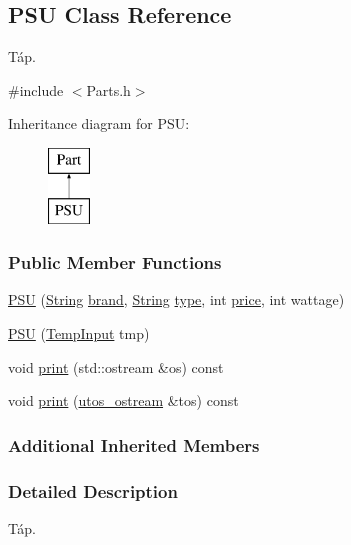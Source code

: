 \subsection{P\+SU Class Reference}
\label{class_p_s_u}


Táp.  




{\ttfamily \#include $<$Parts.\+h$>$}

Inheritance diagram for P\+SU\+:\begin{figure}[H]
\begin{center}
\leavevmode
\includegraphics[height=2.000000cm]{class_p_s_u}
\end{center}
\end{figure}
\subsubsection*{Public Member Functions}
\begin{DoxyCompactItemize}
\item 
\mbox{\hyperlink{class_p_s_u_a1077b85dde400327880d6f37ebaeef49}{P\+SU}} (\mbox{\hyperlink{class_string}{String}} \mbox{\hyperlink{class_part_ae06f2fdeb7fbbdb229a7aca151f3e341}{brand}}, \mbox{\hyperlink{class_string}{String}} \mbox{\hyperlink{class_part_a101dbcc5c4b21564df7414c7eb0eae88}{type}}, int \mbox{\hyperlink{class_part_a8e71223aed1da95a974f33d8d6c91bb1}{price}}, int wattage)
\item 
\mbox{\hyperlink{class_p_s_u_ac6b366346dc0d2263a94b832843ab6b2}{P\+SU}} (\mbox{\hyperlink{struct_temp_input}{Temp\+Input}} tmp)
\item 
void \mbox{\hyperlink{class_p_s_u_ad8f95676e09f5ba805dbba50759f44ba}{print}} (std\+::ostream \&os) const
\item 
void \mbox{\hyperlink{class_p_s_u_a81c74aa3a327003c58b89ca2b8602c1d}{print}} (\mbox{\hyperlink{structutos__ostream}{utos\+\_\+ostream}} \&tos) const
\end{DoxyCompactItemize}
\subsubsection*{Additional Inherited Members}


\subsubsection{Detailed Description}
Táp. 

